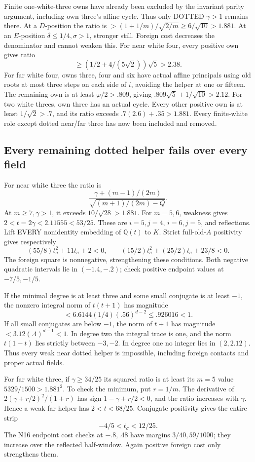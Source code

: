 \documentclass[11pt]{article}
\begin{document}
Finite one-white-three owns have already been excluded by
the invariant parity argument, including own three's affine cycle.
Thus only DOTTED \(\gamma>1\) remains there.
At a \(D\)-position the ratio is
\(>(1+1/m)/\sqrt{2/m}\ge6/\sqrt{10}>1.881\).
At an \(E\)-position \(\delta\le1/4,\sigma>1\), stronger still.
Foreign cost decreases the denominator and cannot weaken this.
For near white four, every positive own gives ratio
\[
            \ge(1/2+4/(5\sqrt2))\sqrt5>2.38 .
\]
For far white four, owns three, four and six have actual
affine principals using old roots at most three steps on each
side of \(i\), avoiding the helper at one or fifteen.
The remaining own is at least \(\varphi/2>.809\), giving
\(.809\sqrt5+1/\sqrt{10}>2.12\).
For two white threes, own three has an actual cycle.
Every other positive own is at least \(1/\sqrt2>.7\),
and its ratio exceeds \(.7(2.6)+.35>1.881\).
Every finite-white role except dotted near/far three has now
been included and removed.

\subsection{Every remaining dotted helper fails over every field}
\label{app:arithA15dottedhelpers}

For near white three the ratio is
\[
 {\frac{\,\gamma+(m-1)/(2m)}{\sqrt{(m+1)/(2m)-Q}}}.
\]
At \(m\ge7,\gamma>1\), it exceeds \(10/\sqrt{28}>1.881\).
For \(m=5,6\), weakness gives
\(2<t=2\gamma<2.11555<53/25\).
These are \(i=5,j=4\), \(i=6,j=5\), and reflections.
Lift EVERY nonidentity embedding of \(\mathbb Q(t)\) to \(K\).
Strict full-old-\(A\) positivity gives respectively
\[
 (55/8)t_\sigma^2+11t_\sigma+2<0,\qquad
 (15/2)t_\sigma^2+(25/2)t_\sigma+23/8<0 .
\]
The foreign square is nonnegative, strengthening these conditions.
Both negative quadratic intervals lie in \((-1.4,-.2)\);
check positive endpoint values at \(-7/5,-1/5\).

If the minimal degree is at least three and some small conjugate
is at least \(-1\), the nonzero integral norm of \(t(t+1)\)
has magnitude
\[
              <6.6144(1/4)(.56)^{d-2}\le.926016<1 .
\]
If all small conjugates are below \(-1\), the norm of \(t+1\)
has magnitude \(<3.12(.4)^{d-1}<1\).
In degree two the integral trace is one, and the norm
\(t(1-t)\) lies strictly between \(-3,-2\).
In degree one no integer lies in \((2,2.12)\).
Thus every weak near dotted helper is impossible, including
foreign contacts and proper actual fields.

For far white three, if \(\gamma\ge34/25\) its squared ratio
is at least its \(m=5\) value \(5329/1500>1.881^2\).
To check the minimum, put \(r=1/m\).
The derivative of \(2(\gamma+r/2)^2/(1+r)\) has sign
\(1-\gamma+r/2<0\), and the ratio increases with \(\gamma\).
Hence a weak far helper has \(2<t<68/25\).
Conjugate positivity gives the entire strip
\[
                            -4/5<t_\sigma<12/25 .
\]
The N16 endpoint cost checks at \(-.8,.48\) have margins
\(3/40,59/1000\); they increase over the reflected half-window.
Again positive foreign cost only strengthens them.
\end{document}
